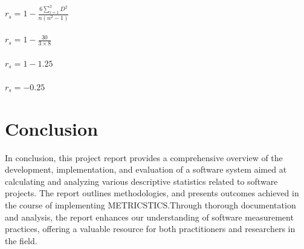\documentclass[runningheads]{llncs}
\begin{document}
\paragraph{$r_s = 1 - \frac{6\sum_{i=1}^3 D^2} {n( n^2-1 )}$}

\paragraph{$r_s = 1 - \frac{30} {3 \times 8}$}

\paragraph{$r_s = 1-1.25$}

\paragraph{$r_s = -0.25$\\}



\newpage
\section {Conclusion}
In conclusion, this project report provides a comprehensive overview of the development, implementation, and evaluation of a software system aimed at calculating and analyzing various descriptive statistics related to software projects. The report outlines methodologies, and presents outcomes achieved in the course of implementing METRICSTICS.Through thorough documentation and analysis, the report enhances our understanding of software measurement practices, offering a valuable resource for both practitioners and researchers in the field.
\end{document}
